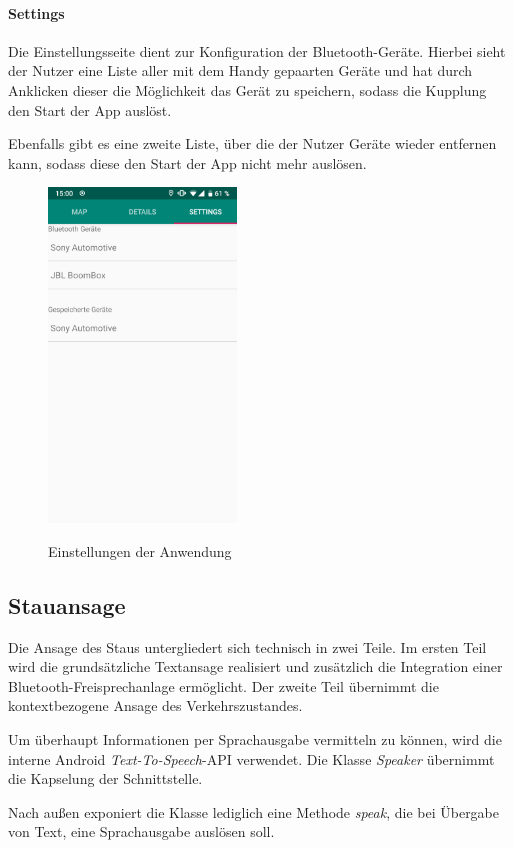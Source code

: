 \paragraph*{Settings}
Die Einstellungsseite dient zur Konfiguration der Bluetooth-Geräte.
Hierbei sieht der Nutzer eine Liste aller mit dem Handy gepaarten Geräte und hat durch Anklicken dieser die Möglichkeit das Gerät zu speichern, sodass die Kupplung den Start der App auslöst.

Ebenfalls gibt es eine zweite Liste, über die der Nutzer Geräte wieder entfernen kann, sodass diese den Start der App nicht mehr auslösen.

\begin{figure}[ht]
   \centering
     \includegraphics[width=5cm]{Bilder/app-settings} \\
 \caption{Einstellungen der Anwendung}
\end{figure}

\subsection{Stauansage}
Die Ansage des Staus untergliedert sich technisch in zwei Teile. Im ersten Teil wird die grundsätzliche Textansage realisiert und zusätzlich die Integration einer Bluetooth-Freisprechanlage ermöglicht.
Der zweite Teil übernimmt die kontextbezogene Ansage des Verkehrszustandes.

Um überhaupt Informationen per Sprachausgabe vermitteln zu können, wird die interne Android {\em Text-To-Speech}-API verwendet.
Die Klasse {\em Speaker} übernimmt die Kapselung der Schnittstelle.

Nach außen exponiert die Klasse lediglich eine Methode {\em speak}, die bei Übergabe von Text, eine Sprachausgabe auslösen soll.

